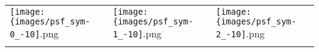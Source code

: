  \begin{tabular}{lll}
\texttt{[image: \{images/psf\_sym-0\_-10]}.png} &\texttt{[image: \{images/psf\_sym-1\_-10]}.png} &\texttt{[image: \{images/psf\_sym-2\_-10]}.png} 
 \\ \hfill\end{tabular}